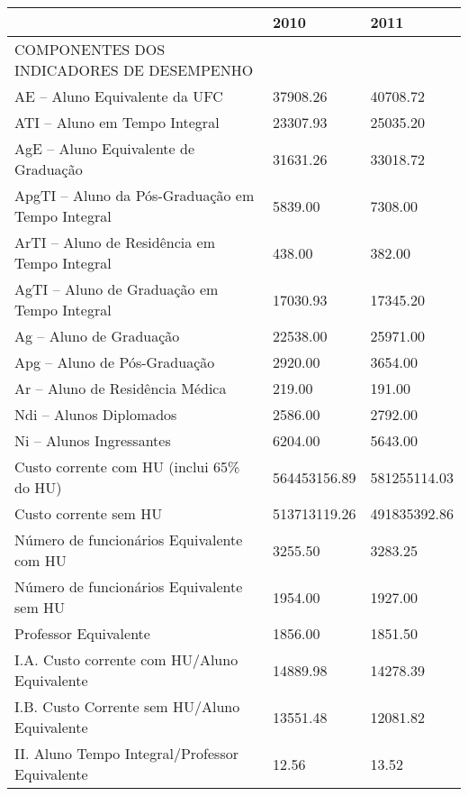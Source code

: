\documentclass{report}
\begin{document}
\begin{tabular}{lll}
\toprule
{} &          2010 &          2011 \\
\midrule
COMPONENTES DOS INDICADORES DE DESEMPENHO                   &               &               \\
AE – Aluno Equivalente da UFC                              &  37908.26 &  40708.72 \\
ATI – Aluno em Tempo Integral                               &  23307.93 &  25035.20 \\
AgE – Aluno Equivalente de Graduação                        &  31631.26 &  33018.72 \\
ApgTI – Aluno da Pós-Graduação em Tempo Integral            &  5839.00 &  7308.00 \\
ArTI – Aluno de Residência em Tempo Integral                &  438.00 &  382.00 \\
AgTI – Aluno de Graduação em Tempo Integral                 &  17030.93 &  17345.20 \\
Ag – Aluno de Graduação                                     &  22538.00 &  25971.00 \\
Apg – Aluno de Pós-Graduação                                &  2920.00 &  3654.00 \\
Ar – Aluno de Residência Médica                             &  219.00 &  191.00 \\
Ndi – Alunos Diplomados                                     &  2586.00 &  2792.00 \\
Ni – Alunos Ingressantes                                    &  6204.00 &  5643.00 \\
Custo corrente com HU (inclui 65\% do HU)                   &  564453156.89 &  581255114.03 \\
Custo corrente sem HU                                       &  513713119.26 &  491835392.86 \\
Número de funcionários Equivalente com HU                   &  3255.50 &  3283.25 \\
Número de funcionários Equivalente sem HU                   &  1954.00 &  1927.00 \\
Professor Equivalente                                       &  1856.00 &  1851.50 \\
I.A. Custo corrente com HU/Aluno Equivalente                &  14889.98 &  14278.39 \\
I.B. Custo Corrente sem HU/Aluno Equivalente                &  13551.48 &  12081.82 \\
II. Aluno Tempo Integral/Professor Equivalente              &  12.56 &  13.52 \\

\end{tabular}
\end{document}
